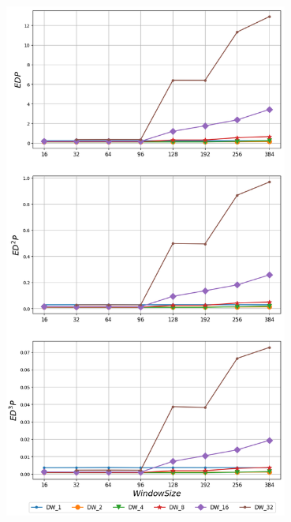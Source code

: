    \begin{minipage}{\textwidth}
      \begin{center}
         \\
         \vspace{3mm}
         \includegraphics[width=0.7\textwidth]{./graphs/edp/sjeng.png}
         \vspace{6mm}
      \end{center}
   \end{minipage}

